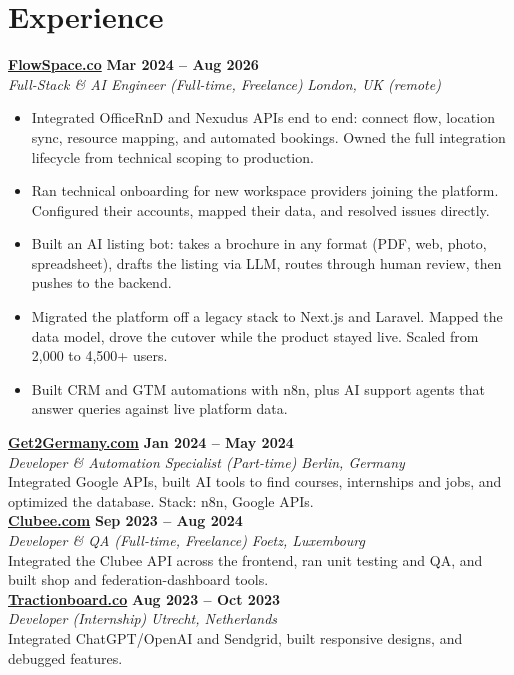 \documentclass[a4paper,10pt]{article}
\newcommand{\role}[4]{%
 \textbf{#1} \hfill \textbf{#2}\\[1pt]%
 \textit{#3} \hfill \textit{#4}\\[2pt]%
}
\begin{document}
\section{Experience}

\role{\href{https://flowspace.co}{FlowSpace.co}}{Mar 2024 -- Aug 2026}{Full-Stack \& AI Engineer (Full-time, Freelance)}{London, UK (remote)}
\begin{itemize}
 \item Integrated OfficeRnD and Nexudus APIs end to end: connect flow, location sync, resource mapping, and automated bookings. Owned the full integration lifecycle from technical scoping to production.
 \item Ran technical onboarding for new workspace providers joining the platform. Configured their accounts, mapped their data, and resolved issues directly.
 \item Built an AI listing bot: takes a brochure in any format (PDF, web, photo, spreadsheet), drafts the listing via LLM, routes through human review, then pushes to the backend.
 \item Migrated the platform off a legacy stack to Next.js and Laravel. Mapped the data model, drove the cutover while the product stayed live. Scaled from 2,000 to 4,500+ users.
 \item Built CRM and GTM automations with n8n, plus AI support agents that answer queries against live platform data.
\end{itemize}

\role{\href{https://get2germany.com}{Get2Germany.com}}{Jan 2024 -- May 2024}{Developer \& Automation Specialist (Part-time)}{Berlin, Germany}
Integrated Google APIs, built AI tools to find courses, internships and jobs, and optimized the database. Stack: n8n, Google APIs.\\[1pt]

\role{\href{https://clubee.com}{Clubee.com}}{Sep 2023 -- Aug 2024}{Developer \& QA (Full-time, Freelance)}{Foetz, Luxembourg}
Integrated the Clubee API across the frontend, ran unit testing and QA, and built shop and federation-dashboard tools.\\[1pt]

\role{\href{https://tractionboard.co}{Tractionboard.co}}{Aug 2023 -- Oct 2023}{Developer (Internship)}{Utrecht, Netherlands}
Integrated ChatGPT/OpenAI and Sendgrid, built responsive designs, and debugged features.

\end{document}
